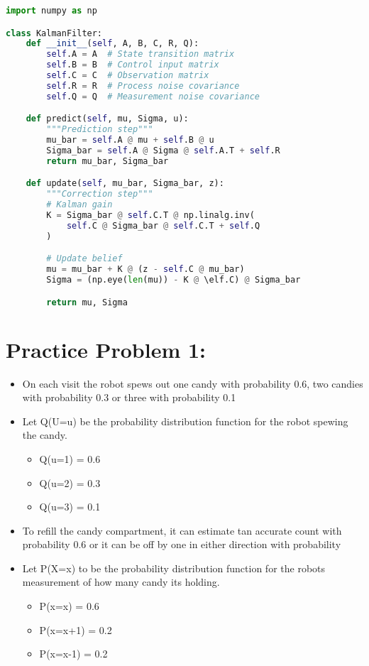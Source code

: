 \documentclass[14pt,letterpaper]{article}
\theoremstyle{definition}
\begin{document}
\begin{lstlisting}[language=Python, caption=Kalman Filter Implementation]
import numpy as np

class KalmanFilter:
    def __init__(self, A, B, C, R, Q):
        self.A = A  # State transition matrix
        self.B = B  # Control input matrix
        self.C = C  # Observation matrix
        self.R = R  # Process noise covariance
        self.Q = Q  # Measurement noise covariance

    def predict(self, mu, Sigma, u):
        """Prediction step"""
        mu_bar = self.A @ mu + self.B @ u
        Sigma_bar = self.A @ Sigma @ self.A.T + self.R
        return mu_bar, Sigma_bar

    def update(self, mu_bar, Sigma_bar, z):
        """Correction step"""
        # Kalman gain
        K = Sigma_bar @ self.C.T @ np.linalg.inv(
            self.C @ Sigma_bar @ self.C.T + self.Q
        )

        # Update belief
        mu = mu_bar + K @ (z - self.C @ mu_bar)
        Sigma = (np.eye(len(mu)) - K @ \elf.C) @ Sigma_bar

        return mu, Sigma
\end{lstlisting}

\section{Practice Problem 1:}
\begin{itemize}
  \item On each visit the robot spews out one candy with probability $0.6$, two candies with probability 0.3 or three with probability 0.1
  \item Let Q(U=u) be the probability distribution function for the robot spewing the candy.
  \begin{itemize}
    \item Q(u=1) = 0.6
    \item Q(u=2) = 0.3
    \item Q(u=3) = 0.1
  \end{itemize}
  \item To refill the candy compartment, it can estimate tan accurate count with probability 0.6 or it can be off by one in either direction with probability
  \item Let P(X=x) to be the probability distribution function for the robots measurement of how many candy its holding.
  \begin{itemize}
    \item P(x=x) = 0.6
    \item P(x=x+1) = 0.2
    \item P(x=x-1) = 0.2
  \end{itemize}
\end{itemize}
\end{document}
